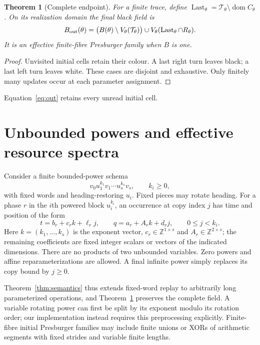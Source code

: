\documentclass[11pt]{article}
\newtheorem{theorem}{Theorem}[section]
\theoremstyle{remark}\newtheorem{remark}[theorem]{Remark}
\newcommand{\dom}{\operatorname{dom}}\newcommand{\ran}{\operatorname{ran}}
\begin{document}
\begin{theorem}[Complete endpoint]\label{thm:output}
For a finite trace, define
$\operatorname{Last}_\theta=\mathcal T_\theta\setminus\dom C_\theta$.
On its realization domain the final black field is
\begin{equation}\label{eq:out}
 B_{\rm out}(\theta)=
 \bigl(B(\theta)\setminus V_\theta(\mathcal T_\theta)\bigr)
 \cup V_\theta(\operatorname{Last}_\theta\cap R_\theta).
\end{equation}
It is an effective finite-fibre Presburger family when $B$ is one.
\end{theorem}
\begin{proof}
Unvisited initial cells retain their colour. A last right turn leaves black;
a last left turn leaves white. These cases are disjoint and exhaustive. Only
finitely many updates occur at each parameter assignment.
\end{proof}
Equation~\eqref{eq:out} retains every unread initial cell.

\section{Unbounded powers and effective resource spectra}\label{sec:power}
Consider a finite bounded-power schema
\begin{equation}\label{eq:schema}
 v_0u_1^{k_1}v_1\cdots u_s^{k_s}v_s,\qquad k_i\ge0,
\end{equation}
with fixed words and heading-restoring $u_i$. Fixed pieces may rotate heading.
For a phase $r$ in the $i$th powered block $u_i^{k_i}$, an occurrence at copy
index $j$ has time and position of the form
\begin{equation}\label{eq:affine}
 t=b_r+c_r k+\ell_r j,\qquad q=a_r+A_r k+d_r j,
 \qquad 0\le j<k_i.
\end{equation}
Here $k=(k_1,\ldots,k_s)$ is the exponent vector,
$c_r\in\mathbb Z^{1\times s}$ and $A_r\in\mathbb Z^{2\times s}$;
the remaining coefficients are fixed integer scalars or vectors of the
indicated dimensions. There are no products of two unbounded
variables. Zero powers and affine reparameterizations are allowed. A final
infinite power simply replaces its copy bound by $j\ge0$.

Theorem~\ref{thm:semantics} thus extends fixed-word replay to arbitrarily long
parameterized operations, and Theorem~\ref{thm:output} preserves the complete
field. A variable rotating power can first be split by its exponent modulo
its rotation order; our implementation instead requires this preprocessing
explicitly. Finite-fibre initial Presburger families may include finite unions
or XORs of arithmetic segments with fixed strides and variable finite lengths.
\end{document}
